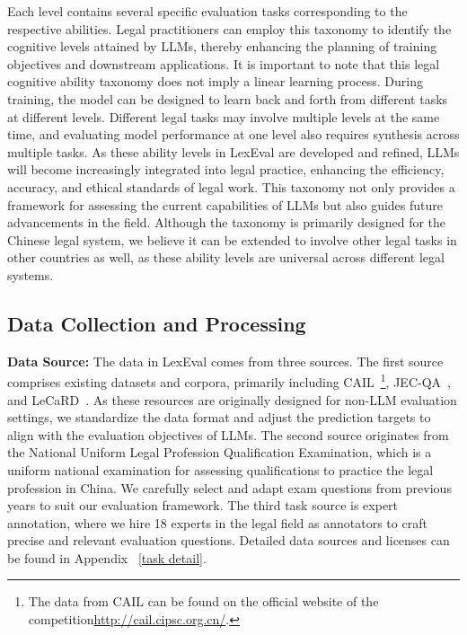Each level contains several specific evaluation tasks corresponding to the respective abilities. Legal practitioners can employ this taxonomy to identify the cognitive levels attained by LLMs, thereby enhancing the planning of training objectives and downstream applications. 
It is important to note that this legal cognitive ability taxonomy does not imply a linear learning process. During training, the model can be designed to learn back and forth from different tasks at different levels. Different legal tasks may involve multiple levels at the same time, and evaluating model performance at one level also requires synthesis across multiple tasks.
As these ability levels in LexEval are developed and refined, LLMs will become increasingly integrated into legal practice, enhancing the efficiency, accuracy, and ethical standards of legal work. This taxonomy not only provides a framework for assessing the current capabilities of LLMs but also guides future advancements in the field. 
Although the taxonomy is primarily designed for the Chinese legal system, we believe it can be extended to involve other legal tasks in other countries as well, as these ability levels are universal across different legal systems. 

\subsection{Data Collection and Processing}
\label{data}
\textbf{Data Source:} The data in LexEval comes from three sources.  The first source comprises existing datasets and corpora, primarily including CAIL~\footnote{The data from CAIL can be found on the official website of the competition\url{http://cail.cipsc.org.cn/}.}, JEC-QA~\cite{zhong2020jec}, and LeCaRD~\cite{ma2021lecard}. As these resources are originally designed for non-LLM evaluation settings, we standardize the data format and adjust the prediction targets to align with the evaluation objectives of LLMs.
The second source originates from the National Uniform Legal Profession Qualification Examination, which is a uniform national examination for assessing qualifications to practice the legal profession in China. We carefully select and adapt exam questions from previous years to suit our evaluation framework.  The third task source is expert annotation, where we hire 18 experts in the legal field as annotators to craft precise and relevant evaluation questions. Detailed data sources and licenses can be found in Appendix ~\ref{task detail}.

